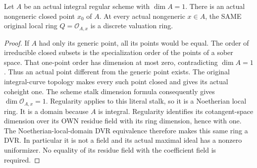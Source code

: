 \begin{lemma}
\label{lem:pl-gauss-paired-curve-stalks-dvr}
\leanok
Let $A$ be an actual integral regular scheme with $\dim A=1$.
There is an actual nongeneric closed point $x_0$ of $A$.
At every actual nongeneric $x\in A$, the SAME original local ring
$Q=\mathcal O_{A,x}$ is a discrete valuation ring.
\end{lemma}
\begin{proof}
If $A$ had only its generic point, all its points would be equal.
The order of irreducible closed subsets is the specialization order
of the points of a sober space. That one-point order has dimension
at most zero, contradicting $\dim A=1$. Thus an actual point different
from the generic point exists. The original integral-curve topology
makes every such point closed and gives its actual coheight one.
The scheme stalk dimension formula consequently gives
$\dim\mathcal O_{A,x}=1$. Regularity applies to this literal stalk,
so it is a Noetherian local ring. It is a domain because $A$ is
integral. Regularity identifies its cotangent-space dimension over
its OWN residue field with its ring dimension, hence with one.
The Noetherian-local-domain DVR equivalence therefore makes this
same ring a DVR. In particular it is not a field and its actual
maximal ideal has a nonzero uniformizer. No equality of its residue
field with the coefficient field is required.
\end{proof}

